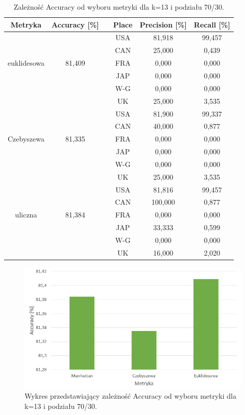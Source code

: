 \documentclass{classrep}
\begin{document}
\begin{table}[h!]
	\centering
	\begin{tabular} {c c c c c c}
		\hline
		\textbf{Metryka} & \textbf{Accuracy [\%]} & \vline & \textbf{Place} & \textbf{Precision [\%]} & \textbf{Recall [\%]}\\ [0.5ex] 
		\hline
		\hline
		&   					&\vline& USA & 81,918 & 99,457 \\
		&						&\vline& CAN & 25,000 & 0,439 \\
		euklidesowa & 81,409    &\vline& FRA & 0,000 & 0,000 \\
		&						&\vline& JAP & 0,000 & 0,000 \\
		&						&\vline& W-G & 0,000 & 0,000 \\
		&		 				&\vline& UK  & 25,000 & 3,535 \\
		\hline 
		&   					&\vline& USA & 81,900 & 99,337 \\
		&						&\vline& CAN & 40,000 & 0,877 \\
		Czebyszewa & 81,335     &\vline& FRA & 0,000 & 0,000 \\
		&						&\vline& JAP  & 0,000 & 0,000 \\
		&						&\vline& W-G & 0,000 & 0,000 \\
		&		 				&\vline& UK  & 25,000 & 3,535 \\
		\hline 
		&   					&\vline& USA & 81,816 & 99,457 \\
		&						&\vline& CAN & 100,000 & 0,877 \\
		uliczna & 81,384        &\vline& FRA & 0,000 & 0,000 \\
		&						&\vline& JAP & 33,333 & 0,599 \\
		&						&\vline& W-G & 0,000 & 0,000 \\
		&		 				&\vline& UK  & 16,000 & 2,020 \\
		\hline
		\hline
	\end{tabular}
	\caption{Zależność Accuracy od wyboru metryki dla k=13 i podziału 70/30. }
	\label{tabelaMetric}
\end{table}

\begin{figure}[h!]
    \centering
    \includegraphics[width=1\textwidth]{accuracyMetric.png}
    \caption{Wykres przedstawiający zależność Accuracy od wyboru metryki dla k=13 i podziału 70/30.}
    \label{accuracyMetric}
\end{figure}
\end{document}
